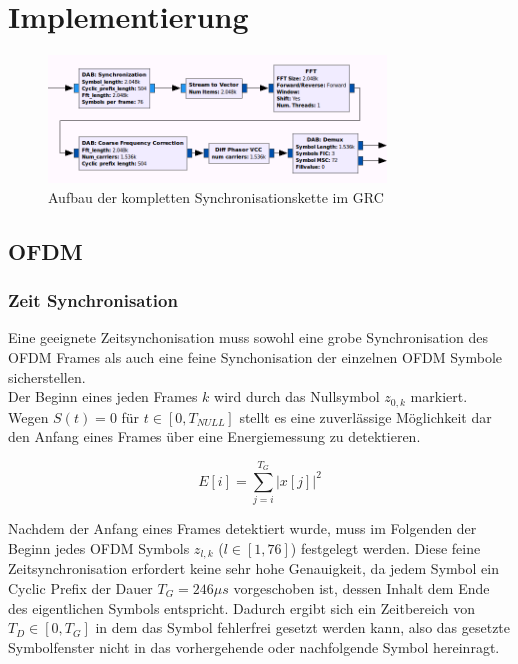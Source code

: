 \let\conjugatet\overline
\chapter{Implementierung}
\begin{figure}[ht]
\centering
  \includegraphics[width=0.8\textwidth]{figures/sync_hier_block.png}
	\caption{Aufbau der kompletten Synchronisationskette im \ac{GRC}}
	\label{fig:sync_overview}
\end{figure}

\section{OFDM}
\subsection{Zeit Synchronisation}
Eine geeignete Zeitsynchonisation muss sowohl eine grobe Synchronisation des OFDM Frames als auch eine feine Synchonisation der einzelnen OFDM Symbole sicherstellen. \\

Der Beginn eines jeden Frames $ k $ wird durch das Nullsymbol $z_{0,k}$ markiert. Wegen $S(t) = 0$ für $t \in [0, T_{NULL}]$ stellt es eine zuverlässige Möglichkeit dar den Anfang eines Frames über eine Energiemessung zu detektieren.

\begin{equation}
E[i] = \sum \limits_{j=i}^{T_G}|x[j]|^2
\label{eq:energy}
\end{equation}

Nachdem der Anfang eines Frames detektiert wurde, muss im Folgenden der Beginn jedes OFDM Symbols $z_{l,k}$ ($l \in [1, 76]$) festgelegt werden. Diese feine Zeitsynchronisation erfordert keine sehr hohe Genauigkeit, da jedem Symbol ein Cyclic Prefix der Dauer $T_G = 246 \mu s $ vorgeschoben ist, dessen Inhalt dem Ende des eigentlichen Symbols entspricht. Dadurch ergibt sich ein Zeitbereich von  $T_D \in [0,T_G]$ in dem das Symbol fehlerfrei gesetzt werden kann, also das gesetzte Symbolfenster nicht in das vorhergehende oder nachfolgende Symbol hereinragt.

